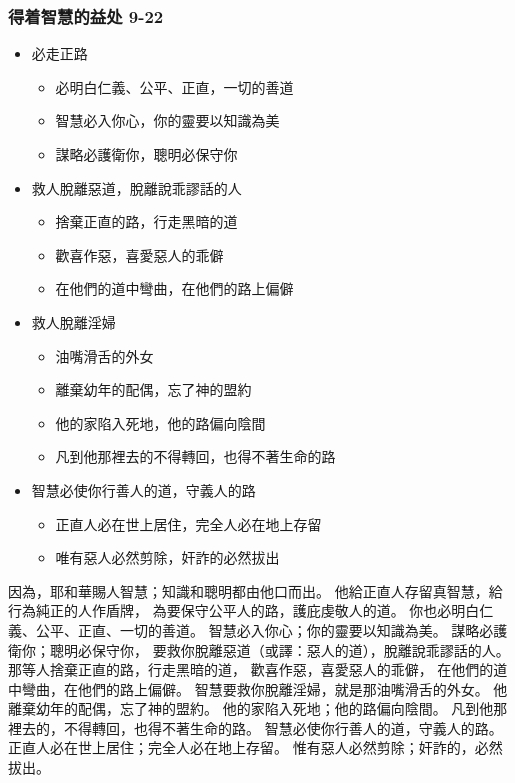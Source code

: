 \subsubsection{得着智慧的益处 9-22}
\begin{itemize}
\itemsep-.45em  
\item 必走正路
\begin{itemize}
\itemsep-.45em  
\item 必明白仁義、公平、正直，一切的善道
\item 智慧必入你心，你的靈要以知識為美
\item 謀略必護衛你，聰明必保守你
\end{itemize}
\item 救人脫離惡道，脫離說乖謬話的人
\begin{itemize}
\itemsep-.45em  
\item 捨棄正直的路，行走黑暗的道
\item 歡喜作惡，喜愛惡人的乖僻
\item 在他們的道中彎曲，在他們的路上偏僻
\end{itemize}
\item 救人脫離淫婦
\begin{itemize}
\itemsep-.45em  
\item 油嘴滑舌的外女
\item 離棄幼年的配偶，忘了神的盟約
\item 他的家陷入死地，他的路偏向陰間
\item 凡到他那裡去的不得轉回，也得不著生命的路
\end{itemize}
\item 智慧必使你行善人的道，守義人的路
\begin{itemize}
\itemsep-.45em  
\item 正直人必在世上居住，完全人必在地上存留
\item 唯有惡人必然剪除，奸詐的必然拔出
\end{itemize}
\end{itemize}
因為，耶和華賜人智慧；知識和聰明都由他口而出。
他給正直人存留真智慧，給行為純正的人作盾牌，
為要保守公平人的路，護庇虔敬人的道。
你也必明白仁義、公平、正直、一切的善道。
智慧必入你心；你的靈要以知識為美。
謀略必護衛你；聰明必保守你，
要救你脫離惡道（或譯：惡人的道），脫離說乖謬話的人。
那等人捨棄正直的路，行走黑暗的道，
歡喜作惡，喜愛惡人的乖僻，
在他們的道中彎曲，在他們的路上偏僻。
智慧要救你脫離淫婦，就是那油嘴滑舌的外女。
他離棄幼年的配偶，忘了神的盟約。
他的家陷入死地；他的路偏向陰間。
凡到他那裡去的，不得轉回，也得不著生命的路。
智慧必使你行善人的道，守義人的路。
正直人必在世上居住；完全人必在地上存留。
惟有惡人必然剪除；奸詐的，必然拔出。


